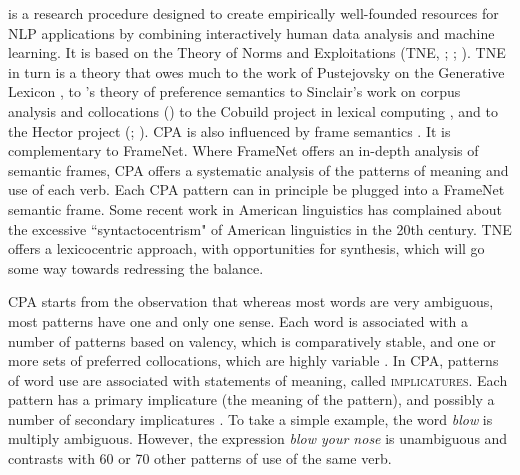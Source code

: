 \documentclass[output=paper]{langsci/langscibook}
\begin{document}
 is a research procedure designed to create
empirically well-founded resources for NLP applications by combining
interactively human data analysis and machine learning. It is based on
the Theory of Norms and Exploitations (TNE, \citealt{hankspustejovsky2004}; \citealt{hanks2005}; \citealt{hanks2013}). 
TNE in turn is a theory that owes much to the
work of Pustejovsky on the Generative Lexicon \citep{pustejovsky1995},
 to \cite{wilks1975}'s theory of preference semantics
 to
Sinclair's work on corpus analysis and collocations (\citealt{Sinclair:66, sinclair1987, Sinclair:1991, sinclair2004})
to the Cobuild project in lexical computing \citep{sinclair1987}, 
and to the Hector project (\citealt{atkins1992}; \citealt{hanks1994}).
CPA is also influenced by frame semantics \citep{fillmore1992}. 
It is complementary
to FrameNet.
Where FrameNet
offers an in-depth analysis of semantic frames, CPA offers a systematic
analysis of the patterns of meaning and use of each verb. Each CPA
pattern can in principle be plugged into a FrameNet semantic frame. Some
recent work in American linguistics \citep{jackendoff2002foundation}  has complained
about the excessive ``syntactocentrism" of American linguistics in the
20th century. TNE offers a lexicocentric approach, with opportunities
for synthesis, which will go some way towards redressing the balance.



CPA starts from the observation that whereas most words are very
ambiguous, most patterns have one and only one sense. Each word is
associated with a number of patterns based on valency, which is
comparatively stable, and one or more sets of preferred collocations,
which are highly variable \citep{hanks2012}.  In CPA, patterns of word use
are associated with statements of meaning, called \textsc{implicatures}. Each
pattern has a primary implicature (the meaning of the pattern), and
possibly a number of secondary implicatures \citep{deschryver2010}. To
take a simple example, the word \textit{blow} is multiply ambiguous. However,
the expression  \textit{blow your nose} is unambiguous and contrasts with 60 or
70 other patterns of use of the same verb.
\end{document}

